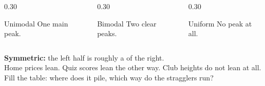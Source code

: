 \documentclass[aspectratio=169, 11pt]{beamer}
\begin{document}
\begin{frame}[t, plain]
  \vspace{6pt}
  \begin{columns}[t]
    \begin{column}{0.30\textwidth}
      \begin{block}{Unimodal}
        One main peak.
      \end{block}
    \end{column}
    \begin{column}{0.30\textwidth}
      \begin{block}{Bimodal}
        Two clear peaks.
      \end{block}
    \end{column}
    \begin{column}{0.30\textwidth}
      \begin{block}{Uniform}
        No peak at all.
      \end{block}
    \end{column}
  \end{columns}
  \vspace{14pt}
  \begin{center}
    {\large \textbf{Symmetric:} the left half is roughly a  of the
    right.}\\[8pt]
    {\small\color{slate} Home prices lean. Quiz scores lean the other way. Club heights do
    not lean at all. Fill the table: where does it pile, which way do the stragglers run?}
  \end{center}
\end{frame}
\end{document}
